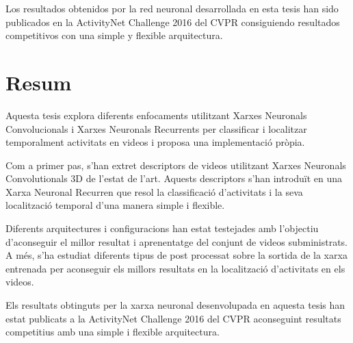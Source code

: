 Los resultados obtenidos por la red neuronal desarrollada en esta tesis han sido publicados en la ActivityNet Challenge 2016 del CVPR consiguiendo resultados competitivos con una simple y flexible arquitectura.

\chapter*{Resum}

Aquesta tesis explora diferents enfocaments utilitzant Xarxes Neuronals Convolucionals i Xarxes Neuronals Recurrents per classificar i localitzar temporalment activitats en videos i proposa una implementació pròpia.

Com a primer pas, s'han extret descriptors de videos utilitzant Xarxes Neuronals Convolutionals 3D de l'estat de l'art. Aquests descriptors s'han introduït en una Xarxa Neuronal Recurren que resol la classificació d'activitats i la seva localització temporal d'una manera simple i flexible.

Diferents arquitectures i configuracions han estat testejades amb l'objectiu d'aconseguir el millor resultat i aprenentatge del conjunt de videos subministrats. A més, s'ha estudiat diferents tipus de post processat sobre la sortida de la xarxa entrenada per aconseguir els millors resultats en la localització d'activitats en els videos.

Els resultats obtinguts per la xarxa neuronal desenvolupada en aquesta tesis han estat publicats a la ActivityNet Challenge 2016 del CVPR aconseguint resultats competitius amb una simple i flexible arquitectura.
